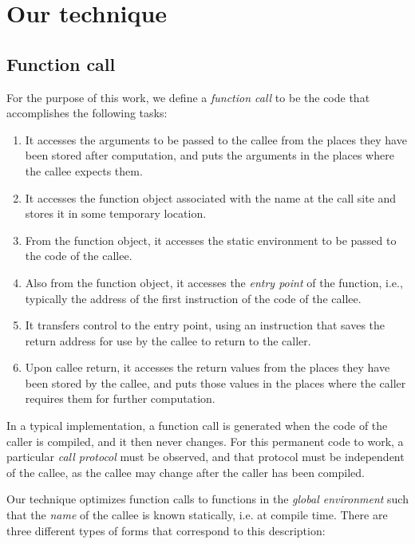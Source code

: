 \section{Our technique}
\label{sec-our-technique}

\subsection{Function call}

For the purpose of this work, we define a \emph{function call} to be
the code that accomplishes the following tasks:

\begin{enumerate}
\item It accesses the arguments to be passed to the callee from the
  places they have been stored after computation, and puts the
  arguments in the places where the callee expects them.
\item It accesses the function object associated with the name at the
  call site and stores it in some temporary location.
\item From the function object, it accesses the static environment to
  be passed to the code of the callee.
\item Also from the function object, it accesses the \emph{entry
  point} of the function, i.e., typically the address of the first
  instruction of the code of the callee.
\item It transfers control to the entry point, using an instruction
  that saves the return address for use by the callee to return to the
  caller.
\item Upon callee return, it accesses the return values from the places
  they have been stored by the callee, and puts those values in the
  places where the caller requires them for further computation.
\end{enumerate}

In a typical implementation, a function call is generated when the
code of the caller is compiled, and it then never changes.  For this
permanent code to work, a particular \emph{call protocol} must be
observed, and that protocol must be independent of the callee, as the
callee may change after the caller has been compiled.

Our technique optimizes function calls to functions in the
\emph{global environment} such that the \emph{name} of the callee is
known statically, i.e. at compile time.  There are three different
types of forms that correspond to this description:

